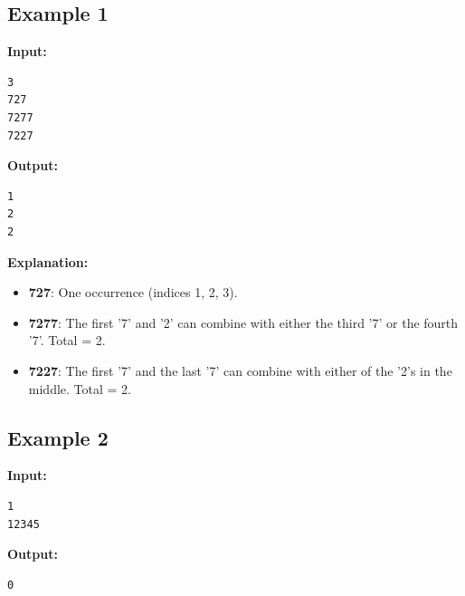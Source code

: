 \documentclass[11pt, letterpaper]{article}
\begin{document}
\subsection*{Example 1}
\textbf{Input:}
\begin{verbatim}
3
727
7277
7227
\end{verbatim}

\textbf{Output:}
\begin{verbatim}
1
2
2
\end{verbatim}

\textbf{Explanation:} \\
\begin{itemize}
    \item \textbf{727}: One occurrence (indices 1, 2, 3).
    \item \textbf{7277}: The first '7' and '2' can combine with either the third '7' or the fourth '7'. Total = 2.
    \item \textbf{7227}: The first '7' and the last '7' can combine with either of the '2's in the middle. Total = 2.
\end{itemize}

\subsection*{Example 2}
\textbf{Input:}
\begin{verbatim}
1
12345
\end{verbatim}

\textbf{Output:}
\begin{verbatim}
0
\end{verbatim}
\end{document}

